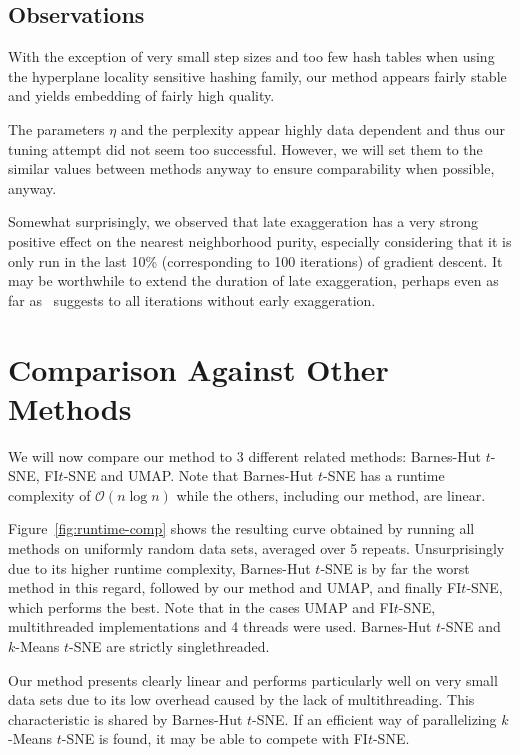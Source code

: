 \subsection{Observations}

With the exception of very small step sizes and too few hash tables when using
the hyperplane locality sensitive hashing family, our method appears fairly
stable and yields embedding of fairly high quality.

The parameters $\eta$ and the perplexity appear highly data dependent and thus our
tuning attempt did not seem too successful. However, we will set them to the similar
values between methods anyway to ensure comparability when possible, anyway.

Somewhat surprisingly, we observed that late exaggeration has a very strong
positive effect on the nearest neighborhood purity, especially considering that
it is only run in the last 10\% (corresponding to 100 iterations) of gradient
descent. It may be worthwhile to extend the duration of late exaggeration,
perhaps even as far as~\cite{arttsne} suggests to all iterations without early
exaggeration.

\vfill

\section{Comparison Against Other Methods}

We will now compare our method to 3 different related methods: Barnes-Hut $t$-SNE,
FI$t$-SNE and UMAP. Note that Barnes-Hut $t$-SNE has a runtime complexity of $\mathcal{O}(n \log n)$
while the others, including our method, are linear.

Figure~\ref{fig:runtime-comp} shows the resulting curve obtained by running all
methods on uniformly random data sets, averaged over 5 repeats. Unsurprisingly
due to its higher runtime complexity, Barnes-Hut $t$-SNE is by far the worst method
in this regard, followed by our method and UMAP, and finally FI$t$-SNE, which performs
the best. Note that in the cases UMAP and FI$t$-SNE, multithreaded implementations and 4 threads
were used. Barnes-Hut $t$-SNE and $k$-Means $t$-SNE are strictly singlethreaded.

Our method presents clearly linear and performs particularly well on very small data sets
due to its low overhead caused by the lack of multithreading. This characteristic is shared
by Barnes-Hut $t$-SNE. If an efficient way of parallelizing $k$-Means $t$-SNE is found,
it may be able to compete with FI$t$-SNE.

